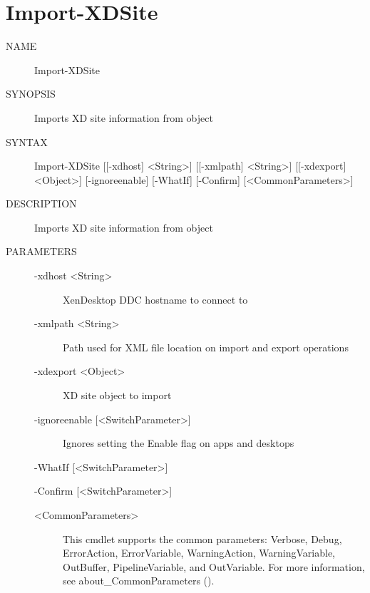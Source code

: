 \documentclass[letterpaper,10pt,english]{sphinxmanual}
\begin{document}
\section{Import-XDSite}
\label{\detokenize{cmd_import:import-xdsite}}\begin{description}
\item[{NAME}] \leavevmode
Import-XDSite

\item[{SYNOPSIS}] \leavevmode
Imports XD site information from object

\item[{SYNTAX}] \leavevmode
Import-XDSite {[}{[}-xdhost{]} \textless{}String\textgreater{}{]} {[}{[}-xmlpath{]} \textless{}String\textgreater{}{]} {[}{[}-xdexport{]} \textless{}Object\textgreater{}{]} {[}-ignoreenable{]} {[}-WhatIf{]} {[}-Confirm{]} {[}\textless{}CommonParameters\textgreater{}{]}

\item[{DESCRIPTION}] \leavevmode
Imports XD site information from object

\item[{PARAMETERS}] \leavevmode\begin{description}
\item[{-xdhost \textless{}String\textgreater{}}] \leavevmode
XenDesktop DDC hostname to connect to

\item[{-xmlpath \textless{}String\textgreater{}}] \leavevmode
Path used for XML file location on import and export operations

\item[{-xdexport \textless{}Object\textgreater{}}] \leavevmode
XD site object to import

\item[{-ignoreenable {[}\textless{}SwitchParameter\textgreater{}{]}}] \leavevmode
Ignores setting the Enable flag on apps and desktops

\end{description}

-WhatIf {[}\textless{}SwitchParameter\textgreater{}{]}

-Confirm {[}\textless{}SwitchParameter\textgreater{}{]}
\begin{description}
\item[{\textless{}CommonParameters\textgreater{}}] \leavevmode
This cmdlet supports the common parameters: Verbose, Debug,
ErrorAction, ErrorVariable, WarningAction, WarningVariable,
OutBuffer, PipelineVariable, and OutVariable. For more information, see
about\_CommonParameters ().


\end{description}
\end{description}
\end{document}
